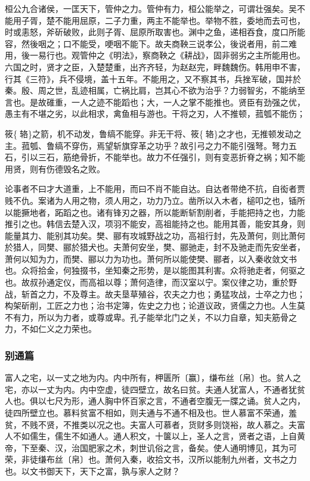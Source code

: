 \documentclass[]{article}
\begin{document}
桓公九合诸侯，一匡天下，管仲之力。管仲有力，桓公能举之，可谓壮强矣。吴不能用子胥，楚不能用屈原，二子力重，两主不能举也。举物不胜，委地而去可也，时或恚怒，斧斫破败，此则子胥、屈原所取害也。渊中之鱼，递相吞食，度口所能容，然後咽之；口不能受，哽咽不能下。故夫商鞅三说孝公，後说者用，前二难用，後一易行也。观管仲之《明法》，察商鞅之《耕战》，固非弱劣之主所能用也。六国之时，贤才之臣，入楚楚重，出齐齐轻，为赵赵完，畔魏魏伤。韩用申不害，行其《三符》，兵不侵境，盖十五年。不能用之，又不察其书，兵挫军破，国并於秦。殷、周之世，乱迹相属，亡祸比肩，岂其心不欲为治乎？力弱智劣，不能纳至言也。是故碓重，一人之迹不能蹈也；大，一人之掌不能推也。贤臣有劲强之优，愚主有不堪之劣，以此相求，禽鱼相与游也。干将之刃，人不推顿，菰瓠不能伤；

筱\{辂\}之箭，机不动发，鲁缟不能穿。非无干将、筱\{辂\}之才也，无推顿发动之主。菰瓠、鲁缟不穿伤，焉望斩旗穿革之功乎？故引弓之力不能引强弩。弩力五石，引以三石，筋绝骨折，不能举也。故力不任强引，则有变恶折脊之祸；知不能用贤，则有伤德毁名之败。

论事者不曰才大道重，上不能用，而曰不肖不能自达。自达者带绝不抗，自衒者贾贱不仇。案诸为人用之物，须人用之，功力乃立。凿所以入木者，槌叩之也，锸所以能撅地者，跖蹈之也。诸有锋刃之器，所以能断斩割削者，手能把持之也，力能推引之也。韩信去楚入汉，项羽不能安，高祖能持之也。能用其善，能安其身，则能量其力、能别其功矣。樊、郦有攻城野战之功，高祖行封，先及萧何，则比萧何於猎人，同樊、郦於猎犬也。夫萧何安坐，樊、郦驰走，封不及驰走而先安坐者，萧何以知为力，而樊、郦以力为功也。萧何所以能使樊、郦者，以入秦收敛文书也。众将拾金，何独掇书，坐知秦之形势，是以能图其利害。众将驰走者，何驱之也。故叔孙通定仪，而高祖以尊；萧何造律，而汉室以宁。案仪律之功，重於野战，斩首之力，不及尊主。故夫垦草殖谷，农夫之力也；勇猛攻战，士卒之力也；构架斫削，工匠之力也；治书定簿，佐史之力也；论道议政，贤儒之力也。人生莫不有力，所以为力者，或尊或卑。孔子能举北门之关，不以力自章，知夫筋骨之力，不如仁义之力荣也。

\hypertarget{header-n564}{%
\subsubsection{别通篇}\label{header-n564}}

富人之宅，以一丈之地为内。内中所有，柙匮所〔赢〕，缣布丝〔帛〕也。贫人之宅，亦以一丈为内。内中空虚，徒四壁立，故名曰贫。夫通人犹富人，不通者犹贫人也。俱以七尺为形，通人胸中怀百家之言，不通者空腹无一牒之诵。贫人之内，徒四所壁立也。慕料贫富不相如，则夫通与不通不相及也。世人慕富不荣通，羞贫，不贱不贤，不推类以况之也。夫富人可慕者，货财多则饶裕，故人慕之。夫富人不如儒生，儒生不如通人。通人积文，十箧以上，圣人之言，贤者之语，上自黄帝，下至秦、汉，治国肥家之术，刺世讥俗之言，备矣。使人通明博见，其为可荣，非徒缣布丝〔帛〕也。萧何入秦，收拾文书，汉所以能制九州者，文书之力也。以文书御天下，天下之富，孰与家人之财？
\end{document}
